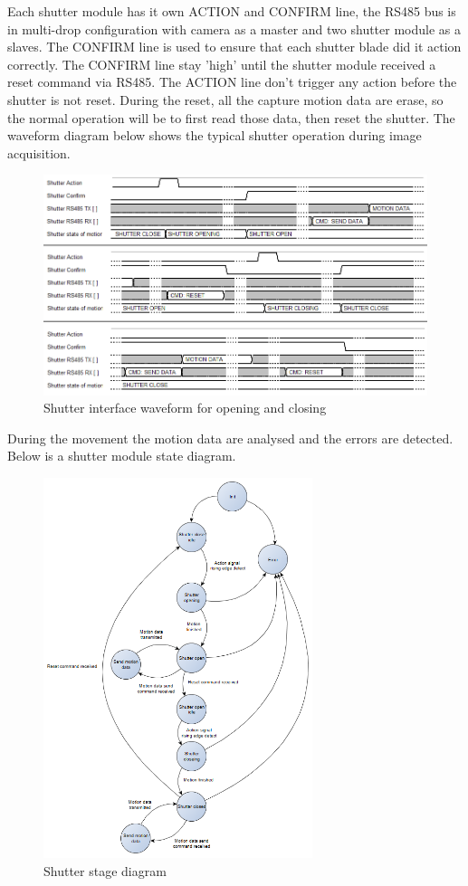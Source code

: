 Each shutter module has it own ACTION and CONFIRM line, the RS485 bus is in multi-drop configuration with camera as a master and two shutter module as a slaves. The CONFIRM line is used to ensure that each shutter blade did it action correctly. The CONFIRM line 
stay 'high' until the shutter module received a reset command via RS485. The ACTION line don't trigger any action before the shutter is not reset. During the reset, all the capture motion data are erase, so the normal operation will be to first read those data, then reset the shutter. The waveform diagram below shows the typical shutter operation during image acquisition.

\begin{figure}[H]
\centering
\includegraphics[width=1\textwidth]{pict/Sht_Wafeform.png}
\caption{Shutter interface waveform for opening and closing}
\label{fig:shtwf}
\end{figure}

During the movement the motion data are analysed and the errors are detected.
Below is a shutter module state diagram.

\begin{figure}[H]
\centering
\includegraphics[width=0.7\textwidth]{pict_ipc/Sht_FSM.png}
\caption{Shutter stage diagram}
\label{fig:shtfsm}
\end{figure}

